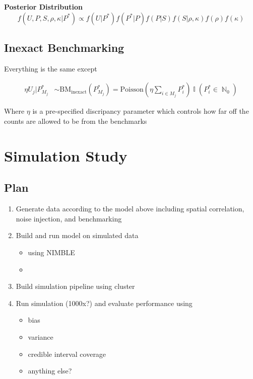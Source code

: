 \documentclass[12pt]{article}
\DeclareMathOperator{\N}{\mathbb{N}}
\DeclareMathOperator{\I}{\mathbb{I}}
\begin{document}
\textbf{Posterior Distribution}
\[ f(U, P, S, \rho, \kappa |P^*) \propto f(U|P^*) f(P^*|P) f(P|S) f(S|\rho, \kappa) f(\rho) f(\kappa) \]

\newpage

\subsection{Inexact Benchmarking}

Everything is the same except 

\begin{align}
    \eta U_j |P_{M_j}^* &\sim \text{BM}_{\text{inexact}}(P_{M_j}^*) = \text{Poisson}(\eta \sum_{i \in M_j} P_i^*) \I(P_i^* \in \N_0)
\end{align} 

Where $\eta$ is a pre-specified discripancy parameter which controls how far off the counts are allowed to be from the benchmarks 

\section{Simulation Study}

\subsection{Plan}

\begin{enumerate}
    \item Generate data according to the model above including spatial correlation, noise injection, and benchmarking

    \item Build and run model on simulated data 
    \begin{itemize}
        \item using NIMBLE
        \item 
    \end{itemize}

    \item Build simulation pipeline using cluster 

    \item Run simulation (1000x?) and evaluate performance using 
    \begin{itemize}
        \item bias
        \item variance
        \item credible interval coverage
        \item anything else? 
    \end{itemize}
\end{enumerate}
\end{document}
